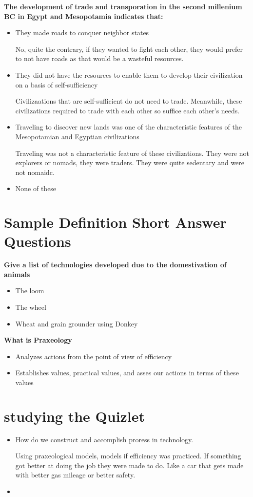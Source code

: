 \documentclass{article}
\begin{document}
\noindent \textbf{The development of trade and transporation in the second millenium
BC in Egypt and Mesopotamia indicates that:}
\begin{itemize}
  \item They made roads to conquer neighbor states

    No, quite the contrary, if they wanted to fight each other,
    they would prefer to not have roads as that would be
    a wasteful resources.
  \item They did not have the resources to enable them to develop
    their civilization on a basis of self-sufficiency

    Civilizaations that are self-sufficient do not need to trade.
    Meanwhile, these civilizations required to trade with each other
    so suffice each other's needs.
  \item Traveling to discover new lands was one of the characteristic features of
    the Mesopotamian and Egyptian civilizations

    Traveling was not a characteristic feature of these civilizations.
    They were not explorers or nomads, they were traders.
    They were quite sedentary and were not nomaidc.
  \item None of these
\end{itemize}

\section{Sample Definition Short Answer Questions}
\noindent \textbf{Give a list of technologies developed due to the domestivation of animals}
\begin{itemize}
  \item The loom
  \item The wheel
  \item Wheat and grain grounder using Donkey
\end{itemize}

\noindent \textbf{What is Praxeology}
\begin{itemize}
  \item Analyzes actions from the point
    of view of efficiency
  \item Establishes values, practical values, and asses our actions
    in terms of these values
\end{itemize}

\section{studying the Quizlet}
\begin{itemize}
  \item How do we construct and accomplish proress
    in technology.

    Using praxeological models, models if efficiency was practiced.
    If something got better at doing the job they were made to do.
    Like a car that gets made with better gas mileage or better safety.
  \item
\end{itemize}
\end{document}

